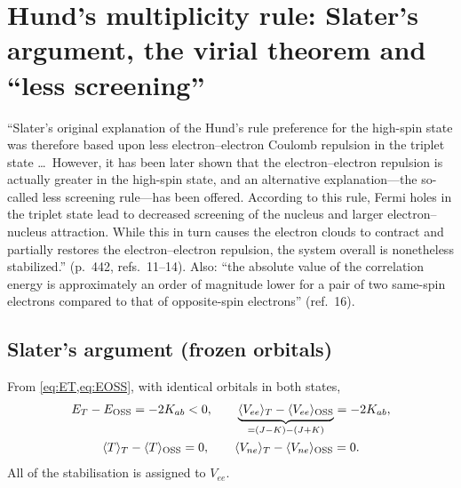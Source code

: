 \section{Hund's multiplicity rule: Slater's argument, the virial theorem and ``less screening''}\label{sec:hund}

\begin{reviewclaim}
``Slater's original explanation of the Hund's rule preference for the high-spin state was therefore
based upon less electron--electron Coulomb repulsion in the triplet state \dots\ However, it has been
later shown that the electron--electron repulsion is actually greater in the high-spin state, and an
alternative explanation---the so-called less screening rule---has been offered. According to this rule,
Fermi holes in the triplet state lead to decreased screening of the nucleus and larger
electron--nucleus attraction. While this in turn causes the electron clouds to contract and partially
restores the electron--electron repulsion, the system overall is nonetheless stabilized.'' (p.~442,
refs.~11--14). Also: ``the absolute value of the correlation energy is approximately an order of
magnitude lower for a pair of two same-spin electrons compared to that of opposite-spin electrons'' (ref.~16).
\end{reviewclaim}

\subsection{Slater's argument (frozen orbitals)}
From \cref{eq:ET,eq:EOSS}, with identical orbitals in both states,
\begin{gather}\label{eq:slater}
  E_T-E_{\text{OSS}}=-2K_{ab}<0,\qquad
  \underbrace{\langle V_{ee}\rangle_T-\langle V_{ee}\rangle_{\text{OSS}}}_{=(J-K)-(J+K)}=-2K_{ab},\\
  \langle T\rangle_T-\langle T\rangle_{\text{OSS}}=0,\qquad \langle V_{ne}\rangle_T-\langle V_{ne}\rangle_{\text{OSS}}=0 .
\end{gather}
All of the stabilisation is assigned to $V_{ee}$.

